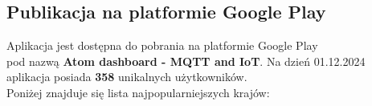 \newpage

\subsection{Publikacja na platformie Google Play}
Aplikacja jest dostępna do pobrania na platformie Google Play\\pod nazwą \textbf{Atom dashboard - MQTT and IoT}.
Na dzień 01.12.2024 aplikacja posiada \textbf{358} unikalnych użytkowników.\\

Poniżej znajduje się lista najpopularniejszych krajów:

